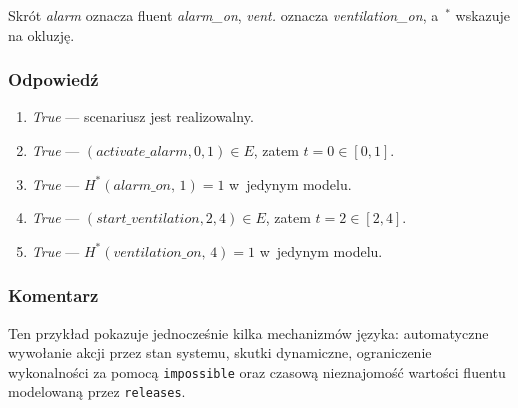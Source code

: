 \documentclass[12pt,a4paper]{article}
\newcommand{\langvar}[1]{\textit{#1}}
\begin{document}
\noindent Skrót \textit{alarm} oznacza fluent \langvar{alarm\_on}, \textit{vent.} oznacza \langvar{ventilation\_on}, a~$^{*}$ wskazuje na okluzję.

\subsubsection*{Odpowiedź}
\begin{enumerate}[label=\arabic*.]
    \item \textit{True} --- scenariusz jest realizowalny.
    \item \textit{True} --- $(activate\_alarm, 0, 1) \in E$, zatem $t=0 \in [0,1]$.
    \item \textit{True} --- $H^*(\textit{alarm\_on},\,1)=1$ w~jedynym modelu.
    \item \textit{True} --- $(start\_ventilation, 2, 4) \in E$, zatem $t=2 \in [2,4]$.
    \item \textit{True} --- $H^*(\textit{ventilation\_on},\,4)=1$ w~jedynym modelu.
\end{enumerate}

\subsubsection*{Komentarz}

Ten przykład pokazuje jednocześnie kilka mechanizmów języka: automatyczne wywołanie akcji przez stan systemu, skutki dynamiczne, ograniczenie wykonalności za pomocą \texttt{impossible} oraz czasową nieznajomość wartości fluentu modelowaną przez \texttt{releases}.
\end{document}
